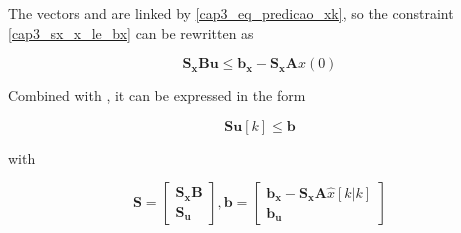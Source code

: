 The vectors  and  are linked by 
\eqref{cap3_eq_predicao_xk}, so the constraint \eqref{cap3_sx_x_le_bx} can be rewritten as

\noindent
\begin{equation}
	\mathbf{S_x} \mathbf{B} \mathbf{u} \le \mathbf{b_x} - \mathbf{S_x} \mathbf{A} x(0)
\end{equation}

Combined with , it can be expressed in the form

\noindent
\begin{equation}
	\mathbf{S} \mathbf{u}[k] \le \mathbf{b}
\end{equation}

\noindent
with

\noindent
\begin{equation}
	\mathbf{S} = \left[ \begin{matrix} \mathbf{S_x} \mathbf{B} \\ \mathbf{S_u} \end{matrix} \right], \mathbf{b} = 
	\left[ \begin{matrix} \mathbf{b_x} - \mathbf{S_x} \mathbf{A} \hat{x}[k|k] \\ \mathbf{b_u} \end{matrix} \right]
\end{equation}
